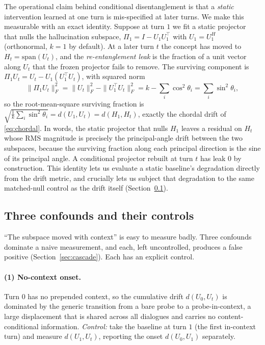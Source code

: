 The operational claim behind conditional disentanglement is that a \emph{static}
intervention learned at one turn is mis-specified at later turns. We make this measurable
with an exact identity. Suppose at turn $1$ we fit a static projector that nulls the
hallucination subspace, $\Pi_1 = I - U_1 U_1^\top$ with $U_1 = U_1^{H}$ (orthonormal,
$k=1$ by default). At a later turn $t$ the concept has moved to $H_t = \mathrm{span}(U_t)$,
and the \emph{re-entanglement leak} is the fraction of a unit vector along $U_t$ that the
frozen projector fails to remove. The surviving component is
$\Pi_1 U_t = U_t - U_1 (U_1^\top U_t)$, with squared norm
\begin{equation}
\label{eq:leak}
\| \Pi_1 U_t \|_F^2 = \| U_t \|_F^2 - \| U_1^\top U_t \|_F^2
= k - \sum_i \cos^2 \theta_i = \sum_i \sin^2 \theta_i,
\end{equation}
so the root-mean-square surviving fraction is
$\sqrt{\tfrac{1}{k}\sum_i \sin^2\theta_i} = d(U_1, U_t) = d(H_1, H_t)$, exactly the chordal
drift of \eqref{eq:chordal}. In words, the static projector that nulls $H_1$ leaves a
residual on $H_t$ whose RMS magnitude is precisely the principal-angle drift between the
two subspaces, because the surviving fraction along each principal direction is the sine of
its principal angle. A conditional projector rebuilt at turn $t$ has leak $0$ by
construction. This identity lets us evaluate a static baseline's degradation directly from
the drift metric, and crucially lets us subject that degradation to the same
matched-null control as the drift itself (Section~\ref{sec:controls}).

\subsection{Three confounds and their controls}
\label{sec:controls}

``The subspace moved with context'' is easy to measure badly. Three confounds dominate a
naive measurement, and each, left uncontrolled, produces a false positive
(Section~\ref{sec:cascade}). Each has an explicit control.

\paragraph{(1) No-context onset.} Turn $0$ has no prepended context, so the cumulative
drift $d(U_0, U_t)$ is dominated by the generic transition from a bare probe to a
probe-in-context, a large displacement that is shared across all dialogues and carries no
content-conditional information. \emph{Control:} take the baseline at turn $1$ (the first
in-context turn) and measure $d(U_1, U_t)$, reporting the onset $d(U_0, U_1)$ separately.

